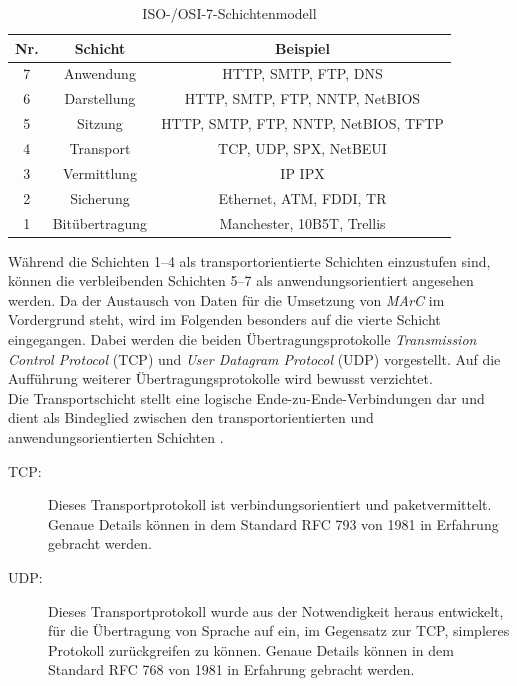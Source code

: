 \begin{table}
	\centering
	\renewcommand{\arraystretch}{1.4}
	\begin{tabular}{|c|c|c|}
		\hline
		\Absatzbox{}
		\textbf{Nr.} & \textbf{Schicht}&\textbf{Beispiel}\\
		\hline
		7 & Anwendung &  HTTP, SMTP, FTP, DNS\\
		\hline
		6 & Darstellung & HTTP, SMTP, FTP, NNTP, NetBIOS\\
		\hline
		5 & Sitzung& HTTP, SMTP, FTP, NNTP, NetBIOS, TFTP\\
		\hline
		4 & Transport & TCP, UDP, SPX, NetBEUI\\
		\hline
		3 & Vermittlung& IP IPX\\
		\hline
		2 & Sicherung & Ethernet, ATM, FDDI, TR\\
		\hline
		1 & Bitübertragung & Manchester, 10B5T, Trellis\\
		\hline
	\end{tabular}
	\caption{ISO-/OSI-7-Schichtenmodell}
	\label{tab:Schichtenmodell}
\end{table}

Während die Schichten 1--4 als transportorientierte Schichten einzustufen sind, können die verbleibenden Schichten 5--7 als anwendungsorientiert angesehen werden. Da der Austausch von Daten für die Umsetzung von \textit{MArC} im Vordergrund steht, wird im Folgenden besonders auf die vierte Schicht eingegangen. Dabei werden die beiden Übertragungsprotokolle \textit{Transmission Control Protocol} (TCP) und \textit{User Datagram Protocol} (UDP) vorgestellt. Auf die Aufführung weiterer Übertragungsprotokolle wird bewusst verzichtet.\\
Die Transportschicht stellt eine logische Ende-zu-Ende-Verbindungen dar und dient als Bindeglied zwischen den transportorientierten und anwendungsorientierten Schichten \cite{ITU}.

\begin{description}
\item[TCP:] Dieses Transportprotokoll ist verbindungsorientiert und paketvermittelt. Genaue Details können in dem Standard RFC 793 \citep{rfc793} von 1981 in Erfahrung gebracht werden.

\item[UDP:] Dieses Transportprotokoll wurde aus der Notwendigkeit heraus entwickelt, für die Übertragung von Sprache auf ein, im Gegensatz zur TCP, simpleres Protokoll zurückgreifen zu können. Genaue Details können in dem Standard RFC 768 \citep{rfc768} von 1981 in Erfahrung gebracht werden.
\end{description}

